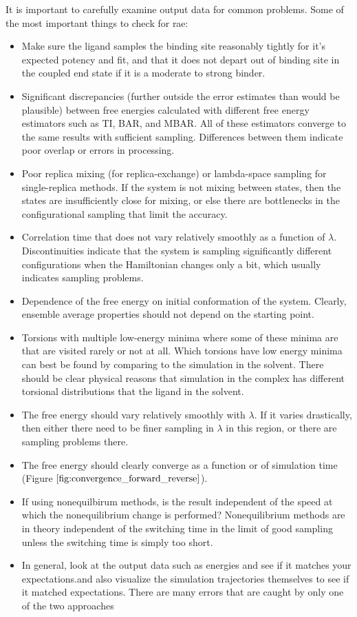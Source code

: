 \documentclass[9pt,bestpractices]{livecoms}
\begin{document}
\item It is important to carefully examine output data for common problems.  Some of the most important things to check for rae:
\begin{itemize}
\item Make sure the ligand samples the binding site reasonably tightly for it's expected potency and fit, and that it does not depart out of binding site in the coupled end state if it is a moderate to strong binder. 
\item Significant discrepancies (further outside the error estimates than would be plausible) between free energies calculated with different free energy estimators such as TI, BAR, and MBAR. All of these estimators converge to the same results with sufficient sampling.  Differences between them indicate poor overlap or errors in processing.
\item Poor replica mixing (for replica-exchange) or lambda-space sampling for single-replica methods. If the system is not mixing between states, then  the states are insufficiently close for mixing, or else there are bottlenecks in the configurational sampling that limit the accuracy.
\item Correlation time  that does not vary relatively smoothly as a function of $\lambda$.  Discontinuities indicate that the system is sampling significantly different configurations when the Hamiltonian changes only a bit, which usually indicates sampling problems.
\item Dependence of the free energy on initial conformation of the system. Clearly, ensemble average properties should not depend on the starting point.
\item Torsions with multiple low-energy minima where some of these minima are that are visited rarely or not at all. Which torsions have low energy minima can best be found by comparing to the simulation in the solvent. There should be clear physical reasons that  simulation in the complex has different torsional distributions that the ligand in the solvent. 
\item The free energy should vary relatively smoothly with $\lambda$. If it varies drastically, then either there need to be finer sampling in $\lambda$ in this region, or there are sampling problems there.
\item The free energy should clearly converge as a function or of simulation time (Figure $\ref{fig:convergence_forward_reverse}$).
\item If using nonequilbirum methods, is the result independent of the speed at which the nonequilibrium change is performed?  Nonequilibrium methods are in theory independent of the switching time in the limit of good sampling unless the switching time is simply too short. 
\item In general, look at the output data such as energies and see if it matches your expectations.and also visualize the simulation trajectories themselves to see if it matched expectations.  There are many errors that are caught by only one of the two approaches
\end{itemize}
\end{document}
